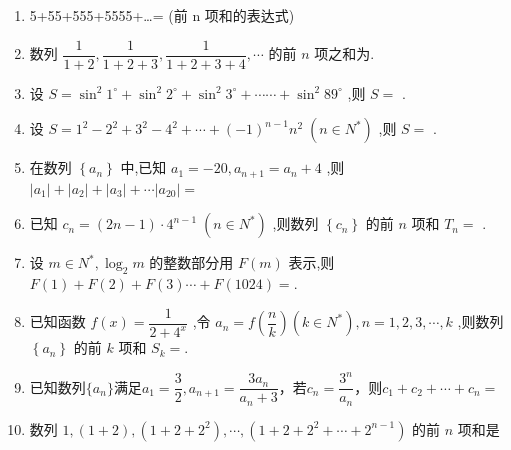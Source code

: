 \begin{enumerate}
    \item 5+55+555+5555+…= (前 n 项和的表达式)
    
    \item 数列 $\dfrac{1}{1 + 2},\dfrac{1}{1 + 2 + 3},\dfrac{1}{1 + 2 + 3 + 4},\cdots$ 的前 $n$ 项之和为.

    \item 设 $S = {\sin }^{2}{1}^{ \circ  } + {\sin }^{2}{2}^{ \circ  } + {\sin }^{2}{3}^{ \circ  } + \cdots \cdots  + {\sin }^{2}{89}^{ \circ  }$ ,则 $S =$ .

    \item 设 $S = {1}^{2} - {2}^{2} + {3}^{2} - {4}^{2} + \cdots  + {\left( -1\right) }^{n - 1}{n}^{2}\;\left( {n \in  {N}^{ * }}\right)$ ,则 $S =$ .

    \item 在数列 $\left\{  {a}_{n}\right\}$ 中,已知 ${a}_{1} =  - {20},{a}_{n + 1} = {a}_{n} + 4$ ,则 $\left| {a}_{1}\right|  + \left| {a}_{2}\right|  + \left| {a}_{3}\right|  + \cdots \left| {a}_{20}\right|  =$ 

    \item 已知 ${c}_{n} = \left( {{2n} - 1}\right)  \cdot  {4}^{n - 1}\;\left( {n \in  {N}^{ * }}\right)$ ,则数列 $\left\{  {c}_{n}\right\}$ 的前 $n$ 项和 ${T}_{n} =$ .

    \item 设 $m \in  {N}^{ * },{\log }_{2}m$ 的整数部分用 $F\left( m\right)$ 表示,则 $F\left( 1\right)  + F\left( 2\right)  + F\left( 3\right) \cdots  + F\left( {1024}\right)  =$.

    \item 已知函数 $f\left( x\right)  = \dfrac{1}{2 + {4}^{x}}$ ,令 ${a}_{n} = f\left( \dfrac{n}{k}\right) \left( {k \in  {N}^{ * }}\right) ,n = 1,2,3,\cdots ,k$ ,则数列 $\left\{  {a}_{n}\right\}$ 的前 $k$ 项和 ${S}_{k} =$.
    
    \item 已知数列$\{a_n\}$满足$a_1 = \dfrac{3}{2}, a_{n+1} = \dfrac{3a_n}{a_n+3}$，若$c_n = \dfrac{3^n}{a_n}$，则$c_1 + c_2 + \cdots + c_n = $

    \item 数列 $1,\left( {1 + 2}\right) ,\left( {1 + 2 + {2}^{2}}\right) ,\cdots ,\left( {1 + 2 + {2}^{2} + \cdots  + {2}^{n - 1}}\right)$ 的前 $n$ 项和是


\end{enumerate}
